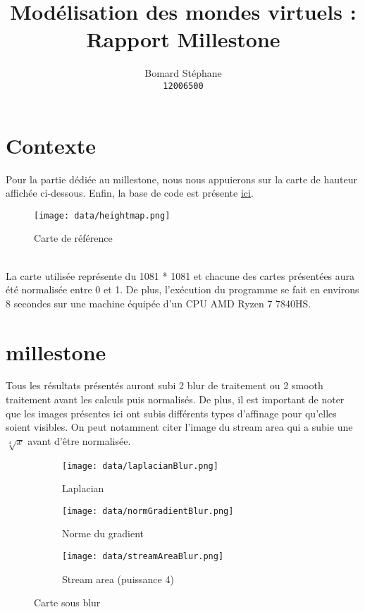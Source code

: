 \documentclass[11pt, letterpaper]{article}
\title{Modélisation des mondes virtuels : \\
    Rapport Millestone}
\author{Bomard Stéphane \\
        {\tt\small 12006500}}
\begin{document}
    \maketitle
    
    \section{Contexte}
        Pour la partie dédiée au millestone, nous nous appuierons sur la carte de hauteur affichée ci-dessous.
        Enfin, la base de code est présente \href{https://github.com/Styami/Modelisation-mondes-virtuels.git}{ici}.
        \begin{figure}[!h]
            \centering 
            \texttt{[image: data/heightmap.png]} 
            \caption{Carte de référence}
            \label{fig:ref}
        \end{figure}\hfill
        \\
        La carte utilisée représente du 1081 * 1081 et chacune des cartes présentées aura été normalisée entre 0 et 1.
        De plus, l'exécution du programme se fait en environs 8 secondes sur une machine équipée d'un CPU AMD Ryzen 7 7840HS.


    \section{millestone}
        Tous les résultats présentés auront subi 2 blur de traitement ou 2 smooth traitement avant les calculs puis normalisés.
        De plus, il est important de noter que les images présentes ici ont subis différents types d'affinage pour qu'elles soient visibles.
        On peut notamment citer l'image du stream area qui a subie une $\sqrt[4]{x}$ avant d'être normalisée.
        
        \begin{figure}[!h]
            \centering
            \begin{subfigure}[a]{0.3\textwidth}
                \centering
                \texttt{[image: data/laplacianBlur.png]}
                \caption{Laplacian}
                \label{fig:laplacian_blur}
            \end{subfigure}
            \hfill
            \begin{subfigure}[b]{0.3\textwidth}
                \centering
                \texttt{[image: data/normGradientBlur.png]}
                \caption{Norme du gradient}
                \label{fig:gradient_blur}
            \end{subfigure}
            \hfill
            \begin{subfigure}[c]{0.3\textwidth}
                \centering
                \texttt{[image: data/streamAreaBlur.png]}
                \caption{Stream area (puissance 4)}
                \label{fig:stream_blur}
            \end{subfigure}
            \label{fig:blur_map}
            \caption{Carte sous blur}
        \end{figure}
        
\end{document}

